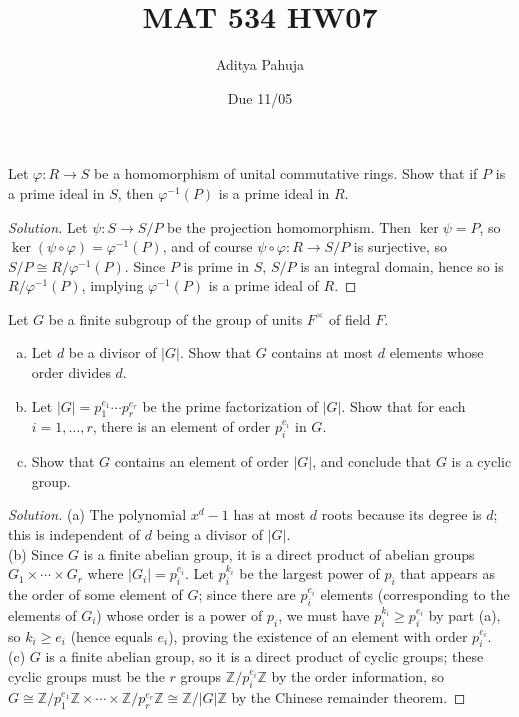 \documentclass[10pt]{article}
\title{MAT 534 HW07}
\author{\large Aditya Pahuja}
\date{\large Due 11/05}
\providecommand{\ZZ}{\mathbb Z}
\providecommand{\ii}{\item}
\providecommand{\inv}{^{-1}}
\newenvironment{soln}{\begin{proof}[Solution]}{\end{proof}}
\providecommand{\abs}[1]{\left|#1\right|}
\begin{document}
\maketitle

\begin{problem}
    Let $\varphi\colon R\to S$ be a homomorphism of unital commutative rings.
    Show that if $P$ is a prime ideal in $S$,
    then $\varphi\inv(P)$ is a prime ideal in $R$.
\end{problem}

\begin{soln}
    Let $\psi\colon S\to S/P$ be the projection homomorphism.
    Then $\ker\psi = P$, so $\ker(\psi\circ\varphi) = \varphi\inv(P)$,
    and of course $\psi\circ\varphi\colon R\to S/P$ is surjective,
    so $S/P\cong R/\varphi\inv(P)$.
    Since $P$ is prime in $S$, $S/P$ is an integral domain,
    hence so is $R/\varphi\inv(P)$, implying $\varphi\inv(P)$ is
    a prime ideal of $R$.
\end{soln}

\begin{problem}
    Let $G$ be a finite subgroup of the group of units $F^\times$ of field $F$.
    \begin{enumerate}[(a)]
        \ii Let $d$ be a divisor of $\abs G$.
	Show that $G$ contains at most $d$ elements whose order divides $d$.
	\ii Let $\abs G = p_1^{e_1}\cdots p_r^{e_r}$
	be the prime factorization of $\abs G$.
	Show that for each $i=1,\dots,r$, there is an element
	of order $p_i^{e_i}$ in $G$.
	\ii Show that $G$ contains an element of order $|G|$,
	and conclude that $G$ is a cyclic group.
    \end{enumerate}
\end{problem}

\begin{soln}
    (a) The polynomial $x^d - 1$ has at most $d$ roots
    because its degree is $d$; this is independent of
    $d$ being a divisor of $\abs G$.
    \\

    (b) Since $G$ is a finite abelian group, it is a direct product
    of abelian groups $G_1\times\cdots\times G_r$ where $\abs{G_i} = p_i^{e_i}$.
    Let $p_i^{k_i}$ be the largest power of $p_i$ that appears as
    the order of some element of $G$; since there are $p_i^{e_i}$ elements
    (corresponding to the elements of $G_i$) whose order is a power of $p_i$,
    we must have $p_i^{k_i}\ge p_i^{e_i}$ by part (a),
    so $k_i \ge e_i$ (hence equals $e_i$), proving the existence
    of an element with order $p_i^{e_i}$.
    \\

    (c) $G$ is a finite abelian group, so it is
    a direct product of cyclic groups; these cyclic groups must be
    the $r$ groups $\ZZ/p_i^{e_i}\ZZ$ by the order information, so
    $G\cong\ZZ/p_1^{e_1}\ZZ\times\cdots\times\ZZ/p_r^{e_r}\ZZ \cong \ZZ/|G|\ZZ$
    by the Chinese remainder theorem.
\end{soln}
\end{document}
